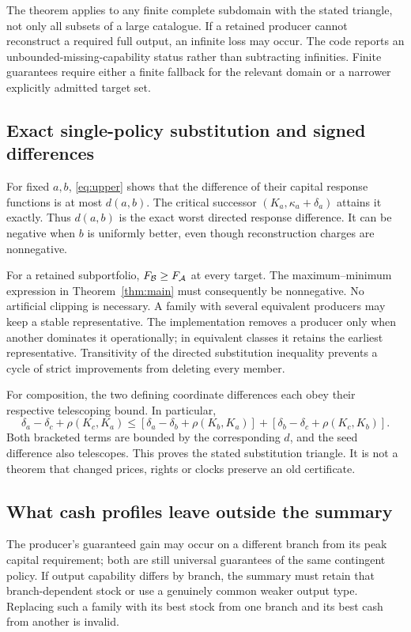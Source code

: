 \documentclass[11pt,letterpaper]{article}
\theoremstyle{definition}\newtheorem{definition}[theorem]{Definition}
\theoremstyle{remark}\newtheorem{remark}[theorem]{Remark}
\begin{document}
The theorem applies to any finite complete subdomain with the stated triangle, not only all subsets of a large catalogue. If a retained producer cannot reconstruct a required full output, an infinite loss may occur. The code reports an unbounded-missing-capability status rather than subtracting infinities. Finite guarantees require either a finite fallback for the relevant domain or a narrower explicitly admitted target set.

\subsection{Exact single-policy substitution and signed differences}
For fixed $a,b$, \eqref{eq:upper} shows that the difference of their capital response functions is at most $d(a,b)$. The critical successor $(K_a,\kappa_a+\delta_a)$ attains it exactly. Thus $d(a,b)$ is the exact worst directed response difference. It can be negative when $b$ is uniformly better, even though reconstruction charges are nonnegative.

For a retained subportfolio, $F_\mathcal B\ge F_\mathcal A$ at every target. The maximum--minimum expression in Theorem~\ref{thm:main} must consequently be nonnegative. No artificial clipping is necessary. A family with several equivalent producers may keep a stable representative. The implementation removes a producer only when another dominates it operationally; in equivalent classes it retains the earliest representative. Transitivity of the directed substitution inequality prevents a cycle of strict improvements from deleting every member.

For composition, the two defining coordinate differences each obey their respective telescoping bound. In particular,
\begin{equation}
 \delta_a-\delta_c+\rho(K_c,K_a)
 \le[\delta_a-\delta_b+\rho(K_b,K_a)]
    +[\delta_b-\delta_c+\rho(K_c,K_b)].
\end{equation}
Both bracketed terms are bounded by the corresponding $d$, and the seed difference also telescopes. This proves the stated substitution triangle. It is not a theorem that changed prices, rights or clocks preserve an old certificate.

\subsection{What cash profiles leave outside the summary}
The producer's guaranteed gain may occur on a different branch from its peak capital requirement; both are still universal guarantees of the same contingent policy. If output capability differs by branch, the summary must retain that branch-dependent stock or use a genuinely common weaker output type. Replacing such a family with its best stock from one branch and its best cash from another is invalid.
\end{document}
